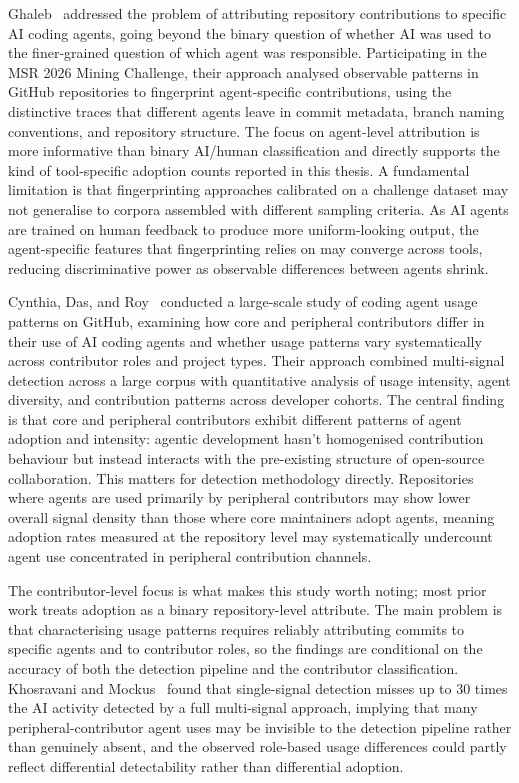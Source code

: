 Ghaleb~\cite{ghaleb2026} addressed the problem of attributing repository contributions
to specific AI coding agents, going beyond the binary question of whether AI was
used to the finer-grained question of which agent was responsible. Participating in
the MSR 2026 Mining Challenge, their approach analysed observable patterns in GitHub
repositories to fingerprint agent-specific contributions, using the distinctive
traces that different agents leave in commit metadata, branch naming conventions, and
repository structure. The focus on agent-level attribution is more informative than
binary AI/human classification and directly supports the kind of tool-specific
adoption counts reported in this thesis. A fundamental limitation is that
fingerprinting approaches calibrated on a challenge dataset may not generalise to
corpora assembled with different sampling criteria. As AI agents are trained on
human feedback to produce more uniform-looking output, the agent-specific features
that fingerprinting relies on may converge across tools, reducing discriminative
power as observable differences between agents shrink.

Cynthia, Das, and Roy~\cite{cynthia2026} conducted a large-scale study of coding
agent usage patterns on GitHub, examining how core and peripheral contributors
differ in their use of AI coding agents and whether usage patterns vary
systematically across contributor roles and project types. Their approach combined
multi-signal detection across a large corpus with quantitative analysis of usage
intensity, agent diversity, and contribution patterns across developer cohorts. The
central finding is that core and peripheral contributors exhibit different patterns
of agent adoption and intensity: agentic development hasn't homogenised contribution
behaviour but instead interacts with the pre-existing structure of open-source
collaboration. This matters for detection methodology directly. Repositories where
agents are used primarily by peripheral contributors may show lower overall signal
density than those where core maintainers adopt agents, meaning adoption rates
measured at the repository level may systematically undercount agent use concentrated
in peripheral contribution channels.

The contributor-level focus is what makes this study worth noting; most prior work
treats adoption as a binary repository-level attribute. The main problem is that
characterising usage patterns requires reliably attributing commits to specific
agents and to contributor roles, so the findings are conditional on the accuracy
of both the detection pipeline and the contributor classification. Khosravani and
Mockus~\cite{khosravani2026} found that single-signal detection misses up to 30 times
the AI activity detected by a full multi-signal approach, implying that many
peripheral-contributor agent uses may be invisible to the detection pipeline rather
than genuinely absent, and the observed role-based usage differences could partly
reflect differential detectability rather than differential adoption.

